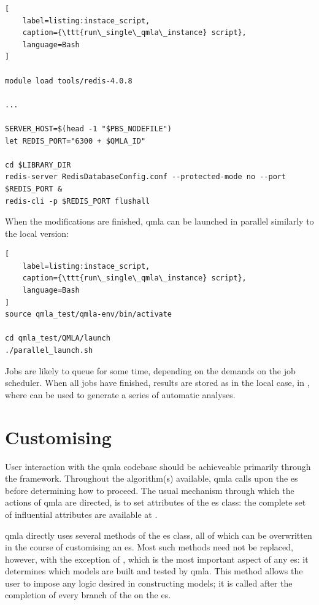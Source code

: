 \begin{lstlisting}[
    label=listing:instace_script,
    caption={\ttt{run\_single\_qmla\_instance} script},
    language=Bash
]

module load tools/redis-4.0.8

... 

SERVER_HOST=$(head -1 "$PBS_NODEFILE")
let REDIS_PORT="6300 + $QMLA_ID"

cd $LIBRARY_DIR
redis-server RedisDatabaseConfig.conf --protected-mode no --port $REDIS_PORT & 
redis-cli -p $REDIS_PORT flushall

\end{lstlisting}

When the modifications are finished, 
    \gls{qmla} can be launched in parallel similarly to the local version: 

\begin{lstlisting}[
    label=listing:instace_script,
    caption={\ttt{run\_single\_qmla\_instance} script},
    language=Bash
]
source qmla_test/qmla-env/bin/activate

cd qmla_test/QMLA/launch
./parallel_launch.sh

\end{lstlisting}
\par 

Jobs are likely to queue for some time, depending on the demands on the job scheduler. 
When all jobs have finished, results are stored as in the local case, 
    in ,
    where  can be used to generate a series of automatic analyses. 
\par 

\section{Customising }
User interaction with the \gls{qmla} codebase should be achieveable primarily through the  framework. 
Throughout the algorithm(s) available, \gls{qmla} calls upon the \gls{es} before determining how to proceed. 
The usual mechanism through which the actions of \gls{qmla} are directed, 
    is to set attributes of the \gls{es} class:
    the complete set of influential attributes are available at \cite{qmla_docs}. 

\par 
\gls{qmla} directly uses several methods of the \gls{es} class, 
    all of which can be overwritten in the course of customising an \gls{es}. 
Most such methods need not be replaced, however, with the exception of , 
    which is the most important aspect of any \gls{es}: 
    it determines which models are built and tested by \gls{qmla}. 
This method allows the user to impose any logic desired in constructing models;
    it is called after the completion of every branch of the   on the \gls{es}. 
\par 

